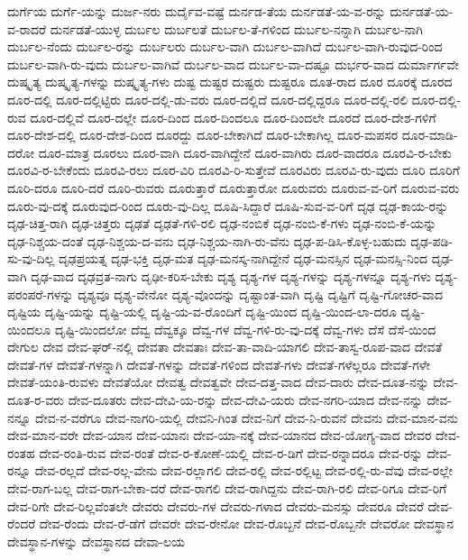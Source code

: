 {ದುರ್ಗೆಯ
ದುರ್ಗೆ-ಯನ್ನು
ದುರ್ಜ-ನರು
ದುರ್ದೈವ-ವಷ್ಟೆ
ದುರ್ನಡ-ತೆಯ
ದುರ್ನಡತೆ-ಯ-ವ-ರನ್ನು
ದುರ್ನಡತೆ-ಯ-ವ-ರಾದರೆ
ದುರ್ನಡತೆ-ಯುಳ್ಳ
ದುರ್ಬಲ
ದುರ್ಬಲತೆ
ದುರ್ಬಲ-ತೆ-ಗಳಿಂದ
ದುರ್ಬಲ-ನನ್ನಾಗಿ
ದುರ್ಬಲ-ನಾಗಿ
ದುರ್ಬಲ-ನೆಂದು
ದುರ್ಬಲ-ರನ್ನು
ದುರ್ಬಲರು
ದುರ್ಬಲ-ವಾಗಿ
ದುರ್ಬಲ-ವಾಗಿದೆ
ದುರ್ಬಲ-ವಾಗಿ-ರುವುದ-ರಿಂದ
ದುರ್ಬಲ-ವಾಗಿ-ರು-ವುದು
ದುರ್ಬಲ-ವಾಗಿವೆ
ದುರ್ಬಲ-ವಾದ
ದುರ್ಬಲ-ವಾ-ದಷ್ಟೂ
ದುರ್ಭರ-ವಾದ
ದುರ್ಮಾರ್ಗವೇ
ದುಷ್ಕೃತ್ಯ
ದುಷ್ಕೃತ್ಯ-ಗಳನ್ನು
ದುಷ್ಕೃತ್ಯ-ಗಳು
ದುಷ್ಟ
ದುಷ್ಟರ
ದುಷ್ಟರು
ದುಷ್ಟರೂ
ದೂತ-ರಾದ
ದೂರ
ದೂರಕ್ಕೆ
ದೂರದ
ದೂರ-ದಲ್ಲಿ
ದೂರ-ದಲ್ಲಿಟ್ಟಿರು
ದೂರ-ದಲ್ಲಿ-ಡು-ವರು
ದೂರ-ದಲ್ಲಿದೆ
ದೂರ-ದಲ್ಲಿದ್ದರೂ
ದೂರ-ದಲ್ಲಿ-ರಲಿ
ದೂರ-ದಲ್ಲಿ-ರುವ
ದೂರ-ದಲ್ಲಿವೆ
ದೂರ-ದಲ್ಲೇ
ದೂರ-ದಿಂದ
ದೂರ-ದಿಂದಲೂ
ದೂರ-ದಿಂದಲೇ
ದೂರದೆ
ದೂರ-ದೇಶ-ಗಳಿಗೆ
ದೂರ-ದೇಶ-ದಲ್ಲಿ
ದೂರ-ದೇಶ-ದಿಂದ
ದೂರದ್ದು
ದೂರ-ಬೇಕಾಗಿದೆ
ದೂರ-ಬೇಕಾಗಿಲ್ಲ
ದೂರ-ಮಪಸರ
ದೂರ-ಮಾಡಿ-ದರೋ
ದೂರ-ಮಾತ್ರ
ದೂರಲು
ದೂರ-ವಾಗಿ
ದೂರ-ವಾಗಿದ್ದೇನೆ
ದೂರ-ವಾಗಿರು
ದೂರ-ವಾದರೂ
ದೂರವಿ-ರ-ಬೇಕು
ದೂರವಿ-ರ-ಬೇಕೆಂದು
ದೂರವಿ-ರಲು
ದೂರ-ವಿರಿ
ದೂರವಿ-ರಿ-ಸುತ್ತೇವೆ
ದೂರವಿರು
ದೂರವಿ-ರು-ವುದು
ದೂರಿ
ದೂರಿಗೆ
ದೂರಿ-ದರೂ
ದೂರಿ-ದರೆ
ದೂರಿ-ರುವರು
ದೂರುತ್ತಾರೆ
ದೂರುತ್ತಾರೋ
ದೂರುವರು
ದೂರುವ-ವ-ರಿಗೆ
ದೂರುವ-ವರು
ದೂರು-ವು-ದಕ್ಕೆ
ದೂರುವುದ-ರಿಂದ
ದೂರು-ವು-ದಿಲ್ಲ
ದೂಷಿ-ಸಿದ್ದಾರೆ
ದೂಷಿ-ಸುವ-ವ-ರಿಗೆ
ದೃಢ
ದೃಢ-ಕಾಯ-ರನ್ನು
ದೃಢ-ಚಿತ್ತ-ರಾಗಿ
ದೃಢ-ಚಿತ್ತರು
ದೃಢತೆ
ದೃಢತೆ-ಗಳಿ-ರಲಿ
ದೃಢ-ನಂಬಿಕೆ
ದೃಢ-ನಂಬಿ-ಕೆ-ಗಳು
ದೃಢ-ನಂಬಿ-ಕೆ-ಯನ್ನು
ದೃಢ-ನಿಶ್ಚಯ-ದಂತೆ
ದೃಢ-ನಿಶ್ಚಯ-ದ-ವನು
ದೃಢ-ನಿಶ್ಚಯ-ನಾಗಿ-ರು-ವೆನು
ದೃಢ-ಪ-ಡಿಸಿ-ಕೊಳ್ಳ-ಬಹುದು
ದೃಢ-ಪಡಿ-ಸು-ವು-ದಿಲ್ಲ
ದೃಢಪ್ರಯತ್ನ
ದೃಢ-ಭಕ್ತಿ
ದೃಢ-ಮತ
ದೃಢ-ಮನಸ್ಕ-ನಾಗಿದ್ದೇನೆ
ದೃಢ-ಮನಸ್ಸಿನ
ದೃಢ-ಮನಸ್ಸಿ-ನಿಂದ
ದೃಢ-ವಾಗಿ
ದೃಢ-ವಾದ
ದೃಢವ್ರತ-ನಾಗು
ದೃಢೀ-ಕರಿಸ-ಬೇಕು
ದೃಶ್ಯ
ದೃಶ್ಯ-ಗಳ
ದೃಶ್ಯ-ಗಳನ್ನು
ದೃಶ್ಯ-ಗಳನ್ನೂ
ದೃಶ್ಯ-ಗಳು
ದೃಶ್ಯ-ಪರಂಪರೆ-ಗಳನ್ನು
ದೃಶ್ಯವೂ
ದೃಶ್ಯ-ವೇನೋ
ದೃಶ್ಯ-ವೊಂದನ್ನು
ದೃಷ್ಟಾಂತ-ವಾಗಿ
ದೃಷ್ಟಿ
ದೃಷ್ಟಿಗೆ
ದೃಷ್ಟಿ-ಗೋಚರ-ವಾದ
ದೃಷ್ಟಿಯ
ದೃಷ್ಟಿ-ಯನ್ನು
ದೃಷ್ಟಿ-ಯಲ್ಲಿ
ದೃಷ್ಟಿ-ಯ-ವ-ರೊಂದಿಗೆ
ದೃಷ್ಟಿ-ಯಿಂದ
ದೃಷ್ಟಿ-ಯಿಂದ-ಲಾ-ದರೂ
ದೃಷ್ಟಿ-ಯಿಂದಲೂ
ದೃಷ್ಟಿ-ಯಿಂದಲೋ
ದೆವ್ವ
ದೆವ್ವಕ್ಕೂ
ದೆವ್ವ-ಗಳ
ದೆವ್ವ-ಗಳಿ-ರು-ವು-ದಕ್ಕೆ
ದೆವ್ವ-ಗಳು
ದೆಸೆ
ದೆಸೆ-ಯಿಂದ
ದೇಗುಲ
ದೇವ
ದೇವ-ಘರ್-ನಲ್ಲಿ
ದೇವತಾ
ದೇವತಾಃ
ದೇವ-ತಾ-ವಾದಿ-ಯಾಗಲಿ
ದೇವ-ತಾಸ್ವ-ರೂಪ-ವಾದ
ದೇವತೆ
ದೇವತೆ-ಗಳ
ದೇವತೆ-ಗಳನ್ನಾಗಿ
ದೇವತೆ-ಗಳನ್ನು
ದೇವತೆ-ಗಳಿಂದ
ದೇವತೆ-ಗಳು
ದೇವತೆ-ಗಳೆಲ್ಲರೂ
ದೇವತೆ-ಗಳೇ
ದೇವತೆ-ಯಂತಿ-ರುವಳು
ದೇವತೆಯೋ
ದೇವತ್ವ
ದೇವತ್ವವೇ
ದೇವ-ದತ್ತ-ವಾದ
ದೇವ-ದಾರು
ದೇವ-ದೂತ-ನನ್ನು
ದೇವ-ದೂತ-ರ-ವರು
ದೇವ-ದೂತರು
ದೇವ-ದೇವಿ-ಯ-ರನ್ನು
ದೇವ-ದೇವಿ-ಯರು
ದೇವ-ನಗರಿ-ಯಾದ
ದೇವ-ನನ್ನು
ದೇವ-ನನ್ನೂ
ದೇವ-ನ-ವರೆಗೂ
ದೇವ-ನಾಗರಿ-ಯಲ್ಲಿ
ದೇವನಿ-ಗಿಂತ
ದೇವ-ನಿಗೆ
ದೇವ-ನಿ-ರುವನೆ
ದೇವನು
ದೇವ-ಮಾನ-ವನು
ದೇವ-ಮಾನ-ವರೇ
ದೇವ-ಯಾನ
ದೇವ-ಯಾನಃ
ದೇವ-ಯಾ-ನಕ್ಕೆ
ದೇವ-ಯಾನದ
ದೇವ-ಯೋಗ್ಯ-ವಾದ
ದೇವರ
ದೇವ-ರಂತಹ
ದೇವ-ರಂತಿ-ರುವ
ದೇವ-ರಂತೆ
ದೇವ-ರ-ಕೋಣೆ-ಯಲ್ಲಿ
ದೇವ-ರ-ಡಿಗೆ
ದೇವ-ರನ್ನಾದರೂ
ದೇವ-ರನ್ನು
ದೇವ-ರನ್ನೂ
ದೇವ-ರಲ್ಲದೆ
ದೇವ-ರಲ್ಲ-ವೇನು
ದೇವ-ರಲ್ಲಾಗಲಿ
ದೇವ-ರಲ್ಲಿ
ದೇವ-ರಲ್ಲಿಟ್ಟ
ದೇವ-ರಲ್ಲಿ-ರು-ವೆವು
ದೇವ-ರಲ್ಲೇ
ದೇವ-ರಾಗ-ಬಲ್ಲ
ದೇವ-ರಾಗ-ಬೇಕಾ-ದರೆ
ದೇವ-ರಾಗಲಿ
ದೇವ-ರಾಗಿದ್ದನು
ದೇವ-ರಾಗಿ-ರಲಿ
ದೇವ-ರಿಗೂ
ದೇವ-ರಿಗೆ
ದೇವ-ರಿಗೇ
ದೇವ-ರಿಲ್ಲವೆಂತಲೇ
ದೇವರು
ದೇವರು-ಗಳ
ದೇವರು-ಗಳಾದ
ದೇವರು-ಮನಸ್ಸು
ದೇವರೂ
ದೇವರೆ
ದೇವ-ರೆಂದರೆ
ದೇವ-ರೆಂದು
ದೇವ-ರೆ-ಡೆಗೆ
ದೇವರೇ
ದೇವ-ರೇನೋ
ದೇವ-ರೊಬ್ಬನೆ
ದೇವ-ರೊಬ್ಬನೇ
ದೇವರೋ
ದೇವಸ್ಥಾನ
ದೇವಸ್ಥಾನ-ಗಳನ್ನು
ದೇವಸ್ಥಾನದ
ದೇವಾ-ಲಯ
}
